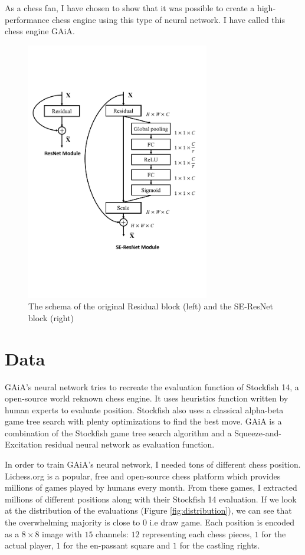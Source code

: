 \documentclass[a4paper]{article}
\begin{document}
As a chess fan, I have chosen to show that it was possible to create a
high-performance chess engine using this type of neural network.
I have called this chess engine GAiA.

\begin{figure}[H]
  \centering
  \includegraphics[width=8cm]{module_seresnet.pdf}
  \caption{The schema of the original Residual block (left) and the SE-ResNet
  block (right)}
  \label{fig:seblock}
\end{figure}

\section{Data}
GAiA's neural network tries to recreate the evaluation function of Stockfish 14,
a open-source world reknown chess engine. It uses heuristics function written
by human experts to evaluate position. Stockfish also uses a classical
alpha-beta game tree search with plenty optimizations to find the best move.
GAiA is a combination of the Stockfish game tree search algorithm and a
Squeeze-and-Excitation residual neural network as evaluation function.

In order to train GAiA's neural network, I needed tons of different
chess position. Lichess.org\cite{lichess} is a popular, free and open-source
chess platform which provides millions of games played by humans every month.
From these games, I extracted millions of different positions along with their
Stockfish 14 evaluation. If we look at the distribution of the evaluations
(Figure \ref{fig:distribution}), we can see that the overwhelming majority
is close to $0$ i.e draw game.
Each position is encoded as a $8\times8$ image with $15$ channels: 
$12$ representing each chess pieces, $1$ for the actual player, $1$
for the en-passant square and $1$ for the castling rights.
\end{document}
